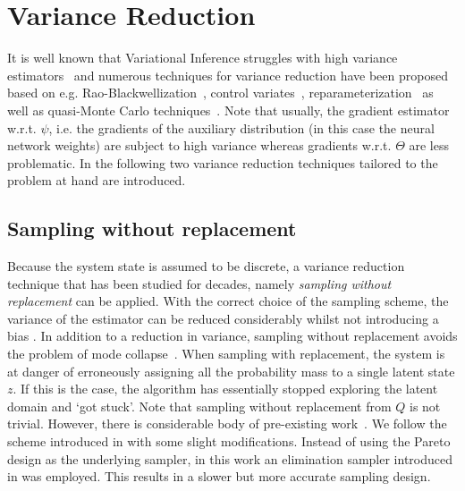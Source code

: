 \section{Variance Reduction}
\label{sec:var_reduc}

It is well known that Variational Inference struggles with high variance estimators~\cite{paisley2012variational} and numerous techniques for variance reduction have been proposed based on e.g. Rao-Blackwellization~\cite{casella1996rao}, control variates~\cite{nelson1987control}, reparameterization~\cite{kingma2013auto} as well as quasi-Monte Carlo techniques~\cite{buchholz2018quasi}. Note that usually, the gradient estimator w.r.t. $\psi$, i.e. the gradients of the auxiliary distribution (in this case the neural network weights) are subject to high variance whereas gradients w.r.t. $\Theta$ are less problematic. In the following two variance reduction techniques tailored to the problem at hand are introduced.

\subsection{Sampling without replacement}
Because the system state is assumed to be discrete, a variance reduction technique that has been studied for decades, namely \emph{sampling without replacement} can be applied. With the correct choice of the sampling scheme, the variance of the estimator can be reduced considerably whilst not introducing a bias \cite{horvitz1952generalization}. In addition to a reduction in variance, sampling without replacement avoids the problem of mode collapse~\cite{arjovsky2017wasserstein}. When sampling with replacement, the system is at danger of erroneously assigning all the probability mass to a single latent state $z$. If this is the case, the algorithm has essentially stopped exploring the latent domain and `got stuck'. Note that sampling without replacement from $Q$ is not trivial. However, there is considerable body of pre-existing work~\cite{rao1962simple,chao1982general,brewer2013sampling}. We follow the scheme introduced in \cite{shah2018without} with some slight modifications. Instead of using the Pareto design as the underlying sampler, in this work an elimination sampler introduced in \cite{deville1998unequal} was employed. This results in a slower but more accurate sampling design.

